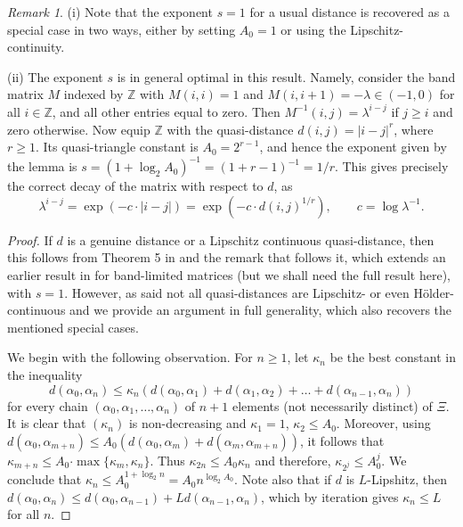 \documentclass{amsart}
\numberwithin{equation}{section}
\theoremstyle{plain}
\theoremstyle{definition}
\theoremstyle{remark}
\newtheorem{remark}[equation]{Remark}
\begin{document}
{{\begin{remark}
(i) Note that the exponent $s=1$ for a usual distance is recovered as a special case in two ways, either by setting $A_{0}=1$ or using the Lipschitz-continuity.

{
(ii) The exponent $s$ is in general optimal in this result. Namely, consider the band matrix $M$ indexed by ${\mathbb{Z}}$ with $M(i,i)=1$ and $M(i,i+1)=-\lambda\in(-1,0)$ for all $i\in{\mathbb{Z}}$, and all other entries equal to zero. Then $M^{-1}(i,j)=\lambda^{i-j}$ if $j\geq i$ and zero otherwise. Now equip ${\mathbb{Z}}$ with the quasi-distance $d(i,j)={|{i-j}|}^r$, where $r\geq 1$. Its quasi-triangle constant is $A_0=2^{r-1}$, and hence the exponent given by the lemma is $s=(1+\log_2 A_0)^{-1}=(1+r-1)^{-1}=1/r$. This gives precisely the correct decay of the matrix with respect to $d$, as
\begin{equation*}
  \lambda^{i-j}=\exp(-c\cdot{|{i-j}|})=\exp(-c\cdot d(i,j)^{1/r}),\qquad c=\log\lambda^{-1}.
\end{equation*}
}
\end{remark}

\begin{proof}  If $d$ is a genuine distance or a Lipschitz continuous quasi-distance, then this follows from Theorem 5 in \cite{Lem2} and the remark that follows it, which extends an earlier result in \cite{Dem} for band-limited matrices (but we shall need the full result here), with $s=1$.  
However, as said not all quasi-distances are Lipschitz- or even H\"older-continuous and we provide an argument {in full generality, which also recovers the mentioned special cases.}

 We begin with the following observation. For $n\ge 1$, let $\kappa_{n}$ be the best  constant in the inequality
$$
d(\alpha_{0},\alpha_{n}) \le \kappa_{n }(d(\alpha_{0},\alpha_{1})+ d(\alpha_{1},\alpha_{2})+ \ldots +d(\alpha_{n-1},\alpha_{n}))$$
for every chain $(\alpha_{0},\alpha_{1}, \dots, \alpha_{n})$ of $n+1$ elements (not necessarily distinct) of $\Xi$. It is clear that $(\kappa_{n})$ is non-decreasing and $\kappa_{1}=1$, $\kappa_{2}\le A_{0}$. 
Moreover, using $d(\alpha_{0}, \alpha_{m+n}) \le A_{0}(d(\alpha_{0}, \alpha_{m})+ d(\alpha_{m}, \alpha_{m+n}))$, it follows that $\kappa_{m+n}\le A_{0}{\cdot\max\{\kappa_{m},\kappa_{n}\}}$. {Thus $\kappa_{2n}\le A_{0}\kappa_{n}$ and therefore, $\kappa_{2^j}\le A_{0}^j$. 
We conclude that $\kappa_{n}\le A_{0}^{1+\log_{2} n}= A_{0} n ^{\log_{2}A_{0}}$. Note also that if $d$ is $L$-Lipshitz, then $d(\alpha_0,\alpha_n)\leq d(\alpha_0,\alpha_{n-1})+Ld(\alpha_{n-1},\alpha_n)$, which by iteration gives $\kappa_n\leq L$ for all $n$.}


\end{proof}}}
\end{document}

